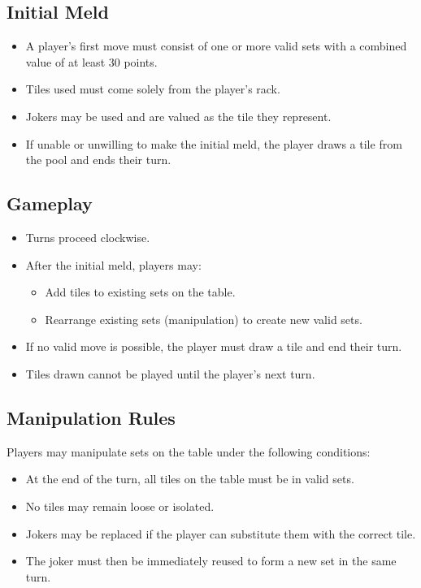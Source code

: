 \documentclass[11pt,letterpaper]{article}
\begin{document}
\subsection*{Initial Meld}
\begin{itemize}
    \item A player's first move must consist of one or more valid sets with a combined value of at least 30 points.
    \item Tiles used must come solely from the player’s rack.
    \item Jokers may be used and are valued as the tile they represent.
    \item If unable or unwilling to make the initial meld, the player draws a tile from the pool and ends their turn.
\end{itemize}

\subsection*{Gameplay}
\begin{itemize}
    \item Turns proceed clockwise.
    \item After the initial meld, players may:
    \begin{itemize}
        \item Add tiles to existing sets on the table.
        \item Rearrange existing sets (manipulation) to create new valid sets.
    \end{itemize}
    \item If no valid move is possible, the player must draw a tile and end their turn.
    \item Tiles drawn cannot be played until the player's next turn.
\end{itemize}

\subsection*{Manipulation Rules}
Players may manipulate sets on the table under the following conditions:
\begin{itemize}
    \item At the end of the turn, all tiles on the table must be in valid sets.
    \item No tiles may remain loose or isolated.
    \item Jokers may be replaced if the player can substitute them with the correct tile.
    \item The joker must then be immediately reused to form a new set in the same turn.
\end{itemize}
\end{document}
